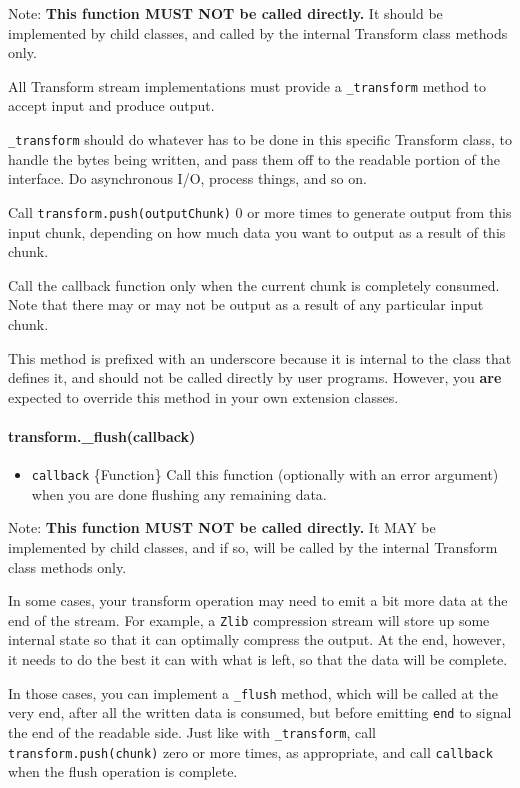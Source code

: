 Note: \textbf{This function MUST NOT be called directly.} It should be
implemented by child classes, and called by the internal Transform class
methods only.

All Transform stream implementations must provide a \texttt{\_transform}
method to accept input and produce output.

\texttt{\_transform} should do whatever has to be done in this specific
Transform class, to handle the bytes being written, and pass them off to
the readable portion of the interface. Do asynchronous I/O, process
things, and so on.

Call \texttt{transform.push(outputChunk)} 0 or more times to generate
output from this input chunk, depending on how much data you want to
output as a result of this chunk.

Call the callback function only when the current chunk is completely
consumed. Note that there may or may not be output as a result of any
particular input chunk.

This method is prefixed with an underscore because it is internal to the
class that defines it, and should not be called directly by user
programs. However, you \textbf{are} expected to override this method in
your own extension classes.

\paragraph{transform.\_flush(callback)}\label{transform.ux5fflushcallback}

\begin{itemize}
\itemsep1pt\parskip0pt
\item
  \texttt{callback} \{Function\} Call this function (optionally with an
  error argument) when you are done flushing any remaining data.
\end{itemize}

Note: \textbf{This function MUST NOT be called directly.} It MAY be
implemented by child classes, and if so, will be called by the internal
Transform class methods only.

In some cases, your transform operation may need to emit a bit more data
at the end of the stream. For example, a \texttt{Zlib} compression
stream will store up some internal state so that it can optimally
compress the output. At the end, however, it needs to do the best it can
with what is left, so that the data will be complete.

In those cases, you can implement a \texttt{\_flush} method, which will
be called at the very end, after all the written data is consumed, but
before emitting \texttt{end} to signal the end of the readable side.
Just like with \texttt{\_transform}, call \texttt{transform.push(chunk)}
zero or more times, as appropriate, and call \texttt{callback} when the
flush operation is complete.

